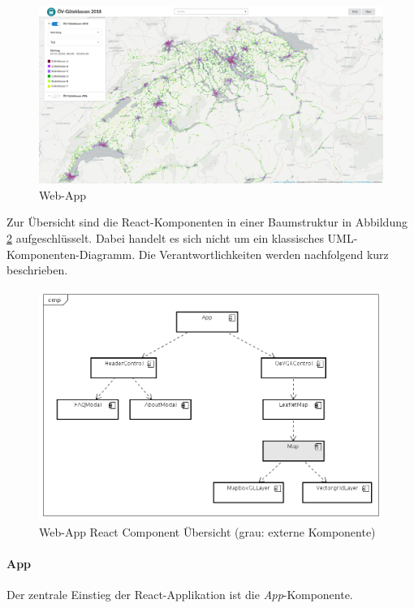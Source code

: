 \begin{figure}[ht]
    \centering
    \includegraphics[width=1.0\linewidth]{projectdoc/img/screenshot-webapp.png}
    \caption[Web-App]{Web-App}
    \label{fig:Web_App}
\end{figure}

Zur Übersicht sind die React-Komponenten in einer Baumstruktur in Abbildung \ref{fig:Web_App_Component} aufgeschlüsselt.
Dabei handelt es sich nicht um ein klassisches UML-Komponenten-Diagramm.
Die Verantwortlichkeiten werden nachfolgend kurz beschrieben.

\begin{figure}[H]
    \centering
    \includegraphics[width=1.0\linewidth]{projectdoc/img/Web-App_Component.png}
    \caption[Web-App React Komponente Übersicht]{Web-App React Component Übersicht (grau: externe Komponente)}
    \label{fig:Web_App_Component}
\end{figure}
 
\paragraph{App}
Der zentrale Einstieg der React-Applikation ist die \emph{App}-Komponente.

